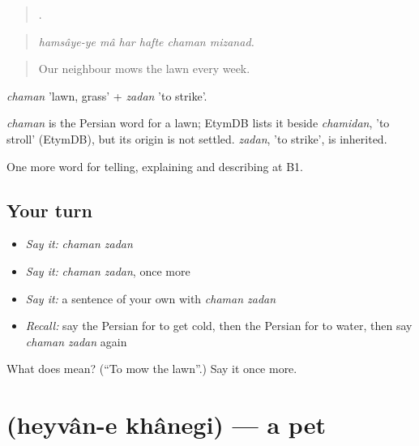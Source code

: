 \begin{quote}
     .
\end{quote}

\begin{quote}
\emph{hamsâye-ye mâ har hafte chaman mizanad.}
\end{quote}

\begin{quote}
Our neighbour mows the lawn every week.
\end{quote}

\emph{chaman} 'lawn, grass' + \emph{zadan} 'to strike'.

\begin{cousinweb}
\emph{chaman} is the Persian word for a lawn; EtymDB lists it beside \emph{chamidan}, 'to stroll' (EtymDB), but its origin is not settled. \emph{zadan}, 'to strike', is inherited.
\end{cousinweb}

\begin{grammarlens}[title={What you've built}]
One more word for telling, explaining and describing at B1.
\end{grammarlens}

\subsection*{Your turn}
\begin{itemize}
\raggedright
  \item \emph{Say it:} \emph{chaman zadan}
  \item \emph{Say it:} \emph{chaman zadan}, once more
  \item \emph{Say it:} a sentence of your own with \emph{chaman zadan}
  \item \emph{Recall:} say the Persian for to get cold, then the Persian for to water, then say \emph{chaman zadan} again
\end{itemize}

\begin{tcolorbox}[breakable,colback=teal!4,colframe=teal!35!black,title={Before you move on}]
What does   mean? (\textquotedblleft{}To mow the lawn\textquotedblright{}.) Say it once more.
\end{tcolorbox}
\section[\texorpdfstring{\fa{حیوان} \fa{خانگی} (heyvân-e khânegi)}{حیوان خانگی (heyvân-e khânegi)}]{  (heyvân-e khânegi) — a pet}

